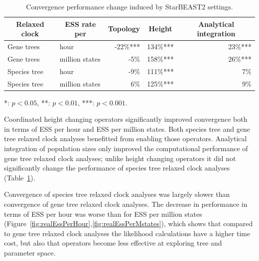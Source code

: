 \documentclass[12pt]{article}
\begin{document}
\begin{table}[htb!]
\centering
\caption{Convergence performance change induced by StarBEAST2 settings.}
\label{tab:convergenceLM}
\begin{threeparttable}
\begin{adjustbox}{center}
\begin{tabular}{|l|l|r|r|r|}
\hline
\multicolumn{1}{|c|}{Relaxed clock} & \multicolumn{1}{c|}{ESS rate per} & \multicolumn{1}{c|}{Topology} & \multicolumn{1}{c|}{Height} & \multicolumn{1}{c|}{Analytical integration}\tabularnewline
\hline
Gene trees & hour & -22\%{***} & 134\%{***} & 23\%{***}\tabularnewline
\hline
Gene trees & million states & -5\%\hphantom{***} & 158\%{***} & 26\%{***}\tabularnewline
\hline
Species tree & hour & -9\%\hphantom{***} & 111\%{***} & 7\%\hphantom{***}\tabularnewline
\hline
Species tree & million states & 6\%\hphantom{***} & 125\%{***} & 9\%\hphantom{***}\tabularnewline
\hline
\end{tabular}
\end{adjustbox}
\begin{tablenotes}
\small
\item \hspace{1cm} {*}: $p < 0.05$, {**}: $p < 0.01$, {***}: $p < 0.001$.
\end{tablenotes}
\end{threeparttable}
\end{table}

Coordinated height changing operators significantly improved convergence both in
terms of ESS per hour and ESS per million states. Both species tree and gene
tree relaxed clock analyses benefitted from enabling those operators. Analytical
integration of population sizes only improved the computational performance of
gene tree relaxed clock analyses; unlike height changing operators it did not
significantly change the performance of species tree relaxed clock analyses
(Table~\ref{tab:convergenceLM}).

Convergence of species tree relaxed clock analyses was largely slower than
convergence of gene tree relaxed clock analyses. The decrease in performance in
terms of ESS per hour was worse than for ESS per million states
(Figure~\ref{fig:realEssPerHour},\ref{fig:realEssPerMstates}), which shows that
compared to gene tree relaxed clock analyses the likelihood calculations have a
higher time cost, but also that operators become less effective at exploring
tree and parameter space.

\clearpage
\end{document}
